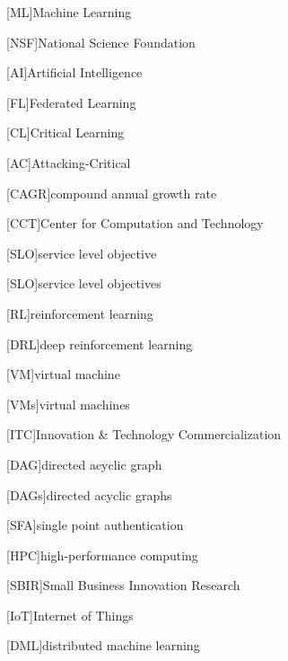 [ML]{Machine Learning}
\newcommand{\ML}{\ac{ML}\xspace}

[NSF]{National Science Foundation}
\newcommand{\NSF}{\ac{NSF}\xspace}

[AI]{Artificial Intelligence}
\newcommand{\AI}{\ac{AI}\xspace}

[FL]{Federated Learning}
\newcommand{\FL}{\ac{FL}\xspace}

[CL]{Critical Learning}
\newcommand{\CL}{\ac{CL}\xspace}

[AC]{Attacking-Critical}
\newcommand{\AC}{\ac{AC}\xspace}

[CAGR]{compound annual growth rate}
\newcommand{\CAGR}{\ac{CAGR}\xspace}

[CCT]{Center for Computation and Technology}
\newcommand{\CCT}{\ac{CCT}\xspace}

[SLO]{service level objective}
\newcommand{\SLO}{\ac{SLO}\xspace}

[SLO]{service level objectives}
\newcommand{\SLOs}{\acp{SLO}\xspace}

[RL]{reinforcement learning}
\newcommand{\RL}{\ac{RL}\xspace}

[DRL]{deep reinforcement learning}
\newcommand{\DRL}{\ac{DRL}\xspace}

[VM]{virtual machine}
\newcommand{\VM}{\ac{VM}\xspace}

[VMs]{virtual machines}
\newcommand{\VMs}{\acp{VM}\xspace}

[ITC]{Innovation \& Technology Commercialization}
\newcommand{\ITC}{\ac{ITC}\xspace}

[DAG]{directed acyclic graph}
\newcommand{\DAG}{\ac{DAG}\xspace}

[DAGs]{directed acyclic graphs}
\newcommand{\DAGs}{\acp{DAG}\xspace}

[SFA]{single point authentication}
\newcommand{\SFA}{\ac{SFA}\xspace}

[HPC]{high-performance computing}
\newcommand{\HPC}{\ac{HPC}\xspace}

[SBIR]{Small Business Innovation Research}
\newcommand{\SBIR}{\ac{SBIR}\xspace}

[IoT]{Internet of Things}
\newcommand{\IoT}{\ac{IoT}\xspace}

[DML]{distributed machine learning}
\newcommand{\DML}{\ac{DML}\xspace}

